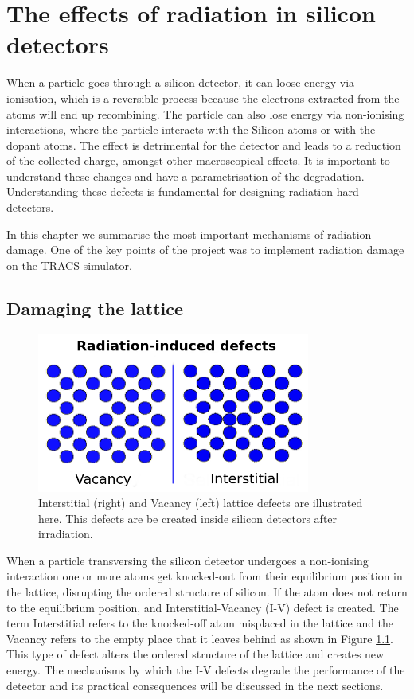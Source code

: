 \chapter{The effects of radiation in silicon detectors}%
\label{chap:rad}

When a particle goes through a silicon detector, it can loose energy via ionisation, which is a reversible process because the electrons extracted from the atoms will end up recombining. The particle can also lose energy via non-ionising interactions, where the particle interacts with the Silicon atoms or with the dopant atoms. The effect is detrimental for the detector and leads to a reduction of the collected charge, amongst other macroscopical effects. It is important to understand these changes and have a parametrisation of the degradation. Understanding these defects is fundamental for designing radiation-hard detectors.

In this chapter we summarise the most important mechanisms of radiation damage. One of the key points of the project was to implement radiation damage on the TRACS simulator.


\section{Damaging the lattice}%

\begin{figure}[H]
	\centering
	\includegraphics[width=0.8\textwidth]{chap3_defects.png}
	\caption{Interstitial (right) and Vacancy (left) lattice defects are illustrated here. This defects are be created inside silicon detectors after irradiation.}
	\label{fig:IV}
\end{figure}

When a particle transversing the silicon detector undergoes a non-ionising interaction one or more atoms get knocked-out from their equilibrium position in the lattice, disrupting the ordered structure of silicon. If the atom does not return to the equilibrium position, and Interstitial-Vacancy (I-V) defect is created. The term Interstitial refers to the knocked-off atom misplaced in the lattice and the Vacancy refers to the empty place that it leaves behind as shown in Figure \ref{fig:IV}. This type of defect alters the ordered structure of the lattice and creates new energy. The mechanisms by which the I-V defects degrade the performance of the detector and its practical consequences will be discussed in the next sections.

